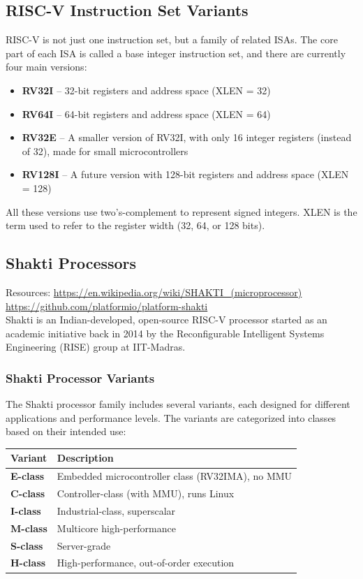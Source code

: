 \documentclass[12pt, a4paper]{article}
\begin{document}
\subsection{RISC-V Instruction Set Variants}
RISC-V is not just one instruction set, but a family of related ISAs. The core part of each ISA is called a base integer instruction set, and there are currently four main versions:

\begin{itemize}[nosep]
    \item \textbf{RV32I} – 32-bit registers and address space (XLEN = 32)
    \item \textbf{RV64I} – 64-bit registers and address space (XLEN = 64)
    \item \textbf{RV32E} – A smaller version of RV32I, with only 16 integer registers (instead of 32), made for small microcontrollers
    \item \textbf{RV128I} – A future version with 128-bit registers and address space (XLEN = 128)
\end{itemize}

All these versions use two's-complement to represent signed integers.
XLEN is the term used to refer to the register width (32, 64, or 128 bits).

\subsection{Shakti Processors}
Resources: \url{https://en.wikipedia.org/wiki/SHAKTI_(microprocessor)} \\
\url{https://github.com/platformio/platform-shakti} \\

Shakti is an Indian-developed, open-source RISC-V processor started as an academic initiative back in 2014 by the Reconfigurable Intelligent Systems Engineering (RISE) group at IIT-Madras. 

\subsubsection{Shakti Processor Variants}
The Shakti processor family includes several variants, each designed for different applications and performance levels. The variants are categorized into classes based on their intended use:
\begin{center}
\begin{tabular}{|l|p{}|}
\hline
\textbf{Variant} & \textbf{Description} \\
\hline
\textbf{E-class} & Embedded microcontroller class (RV32IMA), no MMU \\
\hline
\textbf{C-class} & Controller-class (with MMU), runs Linux \\
\hline
\textbf{I-class} & Industrial-class, superscalar \\
\hline
\textbf{M-class} & Multicore high-performance \\
\hline
\textbf{S-class} & Server-grade \\
\hline
\textbf{H-class} & High-performance, out-of-order execution \\
\hline
\end{tabular}
\end{center}
\end{document}

